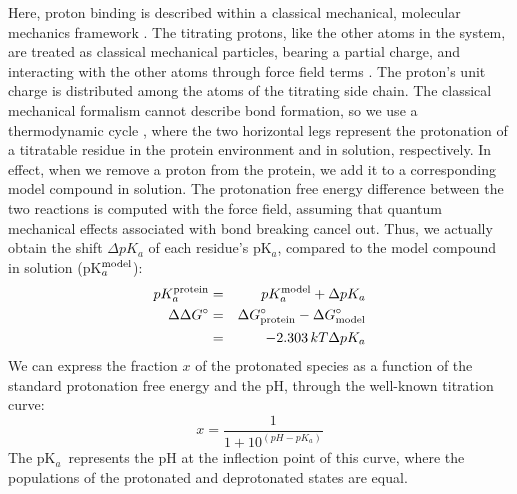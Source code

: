 \documentclass[a4paper,12pt]{article}
\newcommand{\pk}{pK$_a$}
\begin{document}
Here, proton binding is described within a classical mechanical, molecular mechanics framework \cite{Warshel86,
Bashford90,Antosiewicz94,Schaefer98b,Sham98,Simonson04,Alexov11}. The titrating protons, like the other atoms
in the system, are treated as classical mechanical particles, bearing a partial charge, and interacting with
the other atoms through force field terms \cite{Cornell95}. The proton's unit charge is distributed among the
atoms of the titrating side chain. The classical mechanical formalism cannot describe bond formation, so we use
a thermodynamic cycle \cite{Warshel86}, where the two horizontal legs represent the protonation of a titratable
residue in the protein environment and in solution, respectively. In effect, when we remove a proton from the
protein, we add it to a corresponding model compound in solution. The protonation free energy difference between
the two reactions is computed with the force field, assuming that quantum mechanical effects associated with bond
breaking cancel out. Thus, we actually obtain the shift $\Delta pK_a$ of each residue's \pk, compared to the model
compound in solution (pK$_a^{\rm model}$):
\begin{eqnarray}
pK_a^{\rm protein} &=& pK_a^{\rm model} + \Delta pK_a  \\
\Delta \Delta G^{\circ} & = & \Delta G_{\rm protein}^{\circ} - \Delta G_{\rm model}^{\circ} \nonumber  \\ 
                & = & -2.303 \, kT \Delta pK_a 
\end{eqnarray}
We can express the fraction $x$ of the protonated species as a function of the standard protonation free energy and
the pH, through the well-known titration curve:
\begin{equation}\label{eq:tcurve}
 x = \frac{1}{1+10^{(pH-pK_a)}} 
\end{equation}
The \pk\ represents the pH at the inflection point of this curve, where the populations of the protonated and
deprotonated states are equal.
\end{document}
